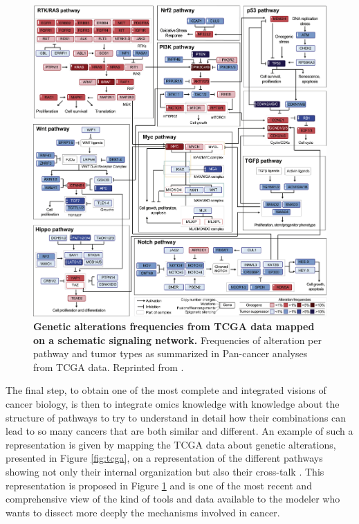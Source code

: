 \documentclass[a4paper,12pt,twoside,onecolumn,openright,final,oldfontcommands]{memoir}
\begin{document}
\begin{figure}

{\centering \includegraphics[width=0.9\linewidth]{fig/pathways} 

}

\caption[Genetic alterations frequencies from TCGA data mapped on a schematic signaling network]{\textbf{Genetic alterations frequencies from TCGA
data mapped on a schematic signaling network.} Frequencies of alteration
per pathway and tumor types as summarized in Pan-cancer analyses from
TCGA data. Reprinted from \citet{sanchez2018oncogenic}.}\label{fig:pathways}
\end{figure}






The final step, to obtain one of the most complete and integrated
visions of cancer biology, is then to integrate omics knowledge with
knowledge about the structure of pathways to try to understand in detail
how their combinations can lead to so many cancers that are both similar
and different. An example of such a representation is given by mapping
the TCGA data about genetic alterations, presented in Figure
\ref{fig:tcga}, on a representation of the different pathways showing
not only their internal organization but also their cross-talk
\citep{sanchez2018oncogenic}. This representation is proposed in Figure
\ref{fig:pathways} and is one of the most recent and comprehensive view
of the kind of tools and data available to the modeler who wants to
dissect more deeply the mechanisms involved in cancer.
\end{document}
